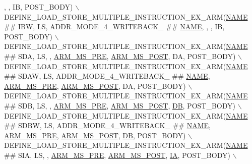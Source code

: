 \begin{DoxyCode}
             ,            , IB, POST\_BODY) \(\backslash\)
    DEFINE\_LOAD\_STORE\_MULTIPLE\_INSTRUCTION\_EX\_ARM(\mbox{\hyperlink{inflate_8h_a164ea0159d5f0b5f12a646f25f99eceaa67bc2ced260a8e43805d2480a785d312}{NAME}} ## IBW,  LS, ADDR\_MODE\_4\_WRITEBACK\_ ## 
      \mbox{\hyperlink{inflate_8h_a164ea0159d5f0b5f12a646f25f99eceaa67bc2ced260a8e43805d2480a785d312}{NAME}},           ,            , IB, POST\_BODY) \(\backslash\)
    DEFINE\_LOAD\_STORE\_MULTIPLE\_INSTRUCTION\_EX\_ARM(\mbox{\hyperlink{inflate_8h_a164ea0159d5f0b5f12a646f25f99eceaa67bc2ced260a8e43805d2480a785d312}{NAME}} ## SDA,  LS,                               , 
      \mbox{\hyperlink{isa-arm_8c_ab421d83d04b870edf4883223176566b9}{ARM\_MS\_PRE}}, \mbox{\hyperlink{isa-arm_8c_a96d347cafe10b558e730777641cab389}{ARM\_MS\_POST}}, DA, POST\_BODY) \(\backslash\)
    DEFINE\_LOAD\_STORE\_MULTIPLE\_INSTRUCTION\_EX\_ARM(\mbox{\hyperlink{inflate_8h_a164ea0159d5f0b5f12a646f25f99eceaa67bc2ced260a8e43805d2480a785d312}{NAME}} ## SDAW, LS, ADDR\_MODE\_4\_WRITEBACK\_ ## 
      \mbox{\hyperlink{inflate_8h_a164ea0159d5f0b5f12a646f25f99eceaa67bc2ced260a8e43805d2480a785d312}{NAME}}, \mbox{\hyperlink{isa-arm_8c_ab421d83d04b870edf4883223176566b9}{ARM\_MS\_PRE}}, \mbox{\hyperlink{isa-arm_8c_a96d347cafe10b558e730777641cab389}{ARM\_MS\_POST}}, DA, POST\_BODY) \(\backslash\)
    DEFINE\_LOAD\_STORE\_MULTIPLE\_INSTRUCTION\_EX\_ARM(\mbox{\hyperlink{inflate_8h_a164ea0159d5f0b5f12a646f25f99eceaa67bc2ced260a8e43805d2480a785d312}{NAME}} ## SDB,  LS,                               , 
      \mbox{\hyperlink{isa-arm_8c_ab421d83d04b870edf4883223176566b9}{ARM\_MS\_PRE}}, \mbox{\hyperlink{isa-arm_8c_a96d347cafe10b558e730777641cab389}{ARM\_MS\_POST}}, \mbox{\hyperlink{isa-thumb_8c_ad4dd2bbef91d8d1a17ca7b9ad41203cd}{DB}}, POST\_BODY) \(\backslash\)
    DEFINE\_LOAD\_STORE\_MULTIPLE\_INSTRUCTION\_EX\_ARM(\mbox{\hyperlink{inflate_8h_a164ea0159d5f0b5f12a646f25f99eceaa67bc2ced260a8e43805d2480a785d312}{NAME}} ## SDBW, LS, ADDR\_MODE\_4\_WRITEBACK\_ ## 
      \mbox{\hyperlink{inflate_8h_a164ea0159d5f0b5f12a646f25f99eceaa67bc2ced260a8e43805d2480a785d312}{NAME}}, \mbox{\hyperlink{isa-arm_8c_ab421d83d04b870edf4883223176566b9}{ARM\_MS\_PRE}}, \mbox{\hyperlink{isa-arm_8c_a96d347cafe10b558e730777641cab389}{ARM\_MS\_POST}}, \mbox{\hyperlink{isa-thumb_8c_ad4dd2bbef91d8d1a17ca7b9ad41203cd}{DB}}, POST\_BODY) \(\backslash\)
    DEFINE\_LOAD\_STORE\_MULTIPLE\_INSTRUCTION\_EX\_ARM(\mbox{\hyperlink{inflate_8h_a164ea0159d5f0b5f12a646f25f99eceaa67bc2ced260a8e43805d2480a785d312}{NAME}} ## SIA,  LS,                               , 
      \mbox{\hyperlink{isa-arm_8c_ab421d83d04b870edf4883223176566b9}{ARM\_MS\_PRE}}, \mbox{\hyperlink{isa-arm_8c_a96d347cafe10b558e730777641cab389}{ARM\_MS\_POST}}, \mbox{\hyperlink{isa-thumb_8c_a3048b70ae3e6d982e60f063bd78fda51}{IA}}, POST\_BODY) \(\backslash\)

\end{DoxyCode}
